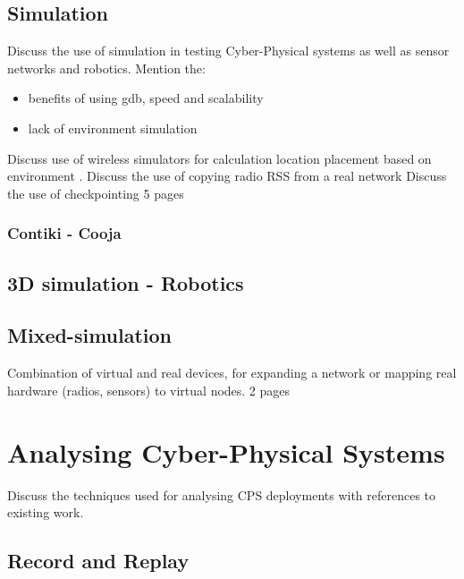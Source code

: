 \subsection{Simulation}
Discuss the use of simulation in testing Cyber-Physical systems as well as sensor networks and robotics.
Mention the:
\begin{itemize}
  \item benefits of using gdb, speed and scalability
  \item lack of environment simulation
\end{itemize}
Discuss use of wireless simulators for calculation location placement based on environment \cite{trunetWireless}.
Discuss the use of copying radio RSS from a real network\cite{morpheous}
Discuss the use of checkpointing
5 pages
\subsubsection{Contiki - Cooja}
\label{sub:Contiki - Cooja}
\subsection{3D simulation - Robotics}
\label{sub:3D simulation - Robotics}

\subsection{Mixed-simulation}
Combination of virtual and real devices, for expanding a network or mapping real hardware (radios, sensors) to virtual nodes.
2 pages

\section{Analysing Cyber-Physical Systems}
\label{sec:Analysing Cyber-Physical Systems}
Discuss the techniques used for analysing CPS deployments with references to existing work.

\subsection{Record and Replay}
\label{sub:Record and Replay}

